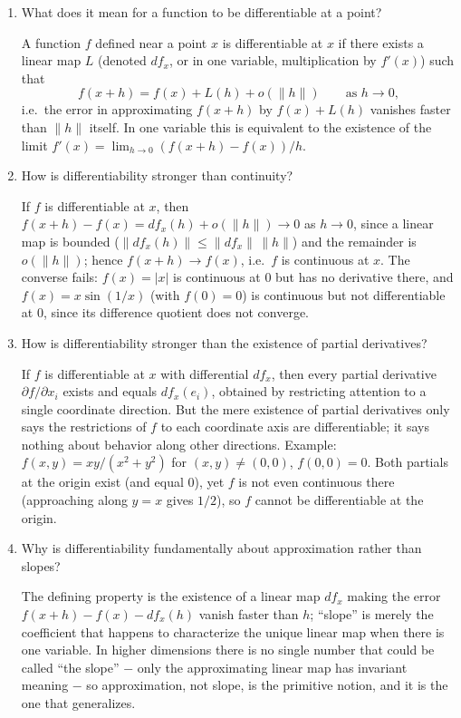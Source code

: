 \documentclass{essay}
\begin{document}
\begin{enumerate}[leftmargin=*, itemsep=8pt]

\item What does it mean for a function to be differentiable at a point?
\begin{answer}
A function \(f\) defined near a point \(x\) is differentiable at \(x\) if there exists a linear map \(L\) (denoted \(df_x\), or in one variable, multiplication by \(f'(x)\)) such that
\[
f(x+h) = f(x) + L(h) + o(\|h\|) \qquad \text{as } h\to0,
\]
i.e.\ the error in approximating \(f(x+h)\) by \(f(x)+L(h)\) vanishes faster than \(\|h\|\) itself. In one variable this is equivalent to the existence of the limit \(f'(x)=\lim_{h\to0}(f(x+h)-f(x))/h\).
\end{answer}

\item How is differentiability stronger than continuity?
\begin{answer}
If \(f\) is differentiable at \(x\), then \(f(x+h)-f(x)=df_x(h)+o(\|h\|)\to0\) as \(h\to0\), since a linear map is bounded (\(\|df_x(h)\|\le\|df_x\|\,\|h\|\)) and the remainder is \(o(\|h\|)\); hence \(f(x+h)\to f(x)\), i.e.\ \(f\) is continuous at \(x\). The converse fails: \(f(x)=|x|\) is continuous at \(0\) but has no derivative there, and \(f(x)=x\sin(1/x)\) (with \(f(0)=0\)) is continuous but not differentiable at \(0\), since its difference quotient does not converge.
\end{answer}

\item How is differentiability stronger than the existence of partial derivatives?
\begin{answer}
If \(f\) is differentiable at \(x\) with differential \(df_x\), then every partial derivative \(\partial f/\partial x_i\) exists and equals \(df_x(e_i)\), obtained by restricting attention to a single coordinate direction. But the mere existence of partial derivatives only says the restrictions of \(f\) to each coordinate axis are differentiable; it says nothing about behavior along other directions. Example: \(f(x,y)=xy/(x^2+y^2)\) for \((x,y)\ne(0,0)\), \(f(0,0)=0\). Both partials at the origin exist (and equal \(0\)), yet \(f\) is not even continuous there (approaching along \(y=x\) gives \(1/2\)), so \(f\) cannot be differentiable at the origin.
\end{answer}

\item Why is differentiability fundamentally about approximation rather than slopes?
\begin{answer}
The defining property is the existence of a linear map \(df_x\) making the error \(f(x+h)-f(x)-df_x(h)\) vanish faster than \(h\); ``slope'' is merely the coefficient that happens to characterize the unique linear map when there is one variable. In higher dimensions there is no single number that could be called ``the slope'' \(-\) only the approximating linear map has invariant meaning \(-\) so approximation, not slope, is the primitive notion, and it is the one that generalizes.
\end{answer}


\end{enumerate}
\end{document}
